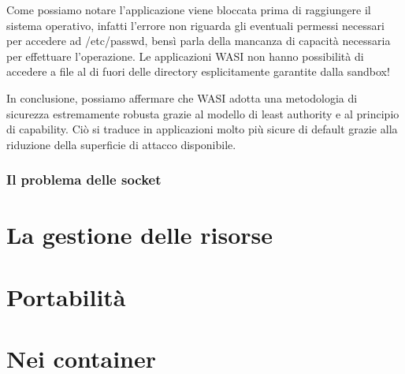 Come possiamo notare l'applicazione viene bloccata prima di raggiungere il sistema operativo, infatti l'errore non
riguarda gli eventuali permessi necessari per accedere ad /etc/passwd, bensì parla della mancanza di capacità necessaria
per effettuare l'operazione. Le applicazioni WASI non hanno possibilità di accedere a file al di fuori delle directory
esplicitamente garantite dalla sandbox!

In conclusione, possiamo affermare che WASI adotta una metodologia di sicurezza estremamente robusta grazie al modello
di least authority e al principio di capability. Ciò si traduce in applicazioni molto più sicure di default grazie alla
riduzione della superficie di attacco disponibile.
\subsubsection{Il problema delle socket}
\section{La gestione delle risorse}

\section{Portabilità}
\section{Nei container}